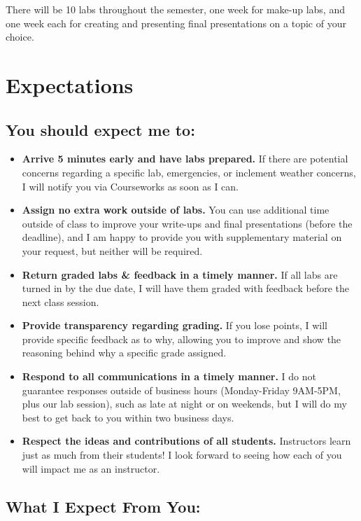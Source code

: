 \documentclass[11pt]{article}
\begin{document}
\noindent There will be 10 labs throughout the semester, one week for make-up labs, and one week each for creating and presenting final presentations on a topic of your choice. 

\section*{Expectations}

\subsection*{You should expect me to:}

\begin{itemize}
\item \textbf{Arrive 5 minutes early and have labs prepared.} If there are potential concerns regarding a specific lab, emergencies, or inclement weather concerns, I will notify you via Courseworks as soon as I can. 
\item \textbf{Assign no extra work outside of labs.} You can use additional time outside of class to improve your write-ups and final presentations (before the deadline), and I am happy to provide you with supplementary material on your request, but neither will be required. 
\item \textbf{Return graded labs \& feedback in a timely manner.} If all labs are turned in by the due date, I will have them graded with feedback before the next class session.
\item \textbf{Provide transparency regarding grading.} If you lose points, I will provide specific feedback as to why, allowing you to improve and show the reasoning behind why a specific grade assigned.
\item \textbf{Respond to all communications in a timely manner.} I do not guarantee responses outside of business hours (Monday-Friday 9AM-5PM, plus our lab session), such as late at night or on weekends, but I will do my best to get back to you within two business days. %
\item \textbf{Respect the ideas and contributions of all students.} Instructors learn just as much from their students! I look forward to seeing how each of you will impact me as an instructor.
\end{itemize}

\subsection*{What I Expect From You:}
\end{document}
